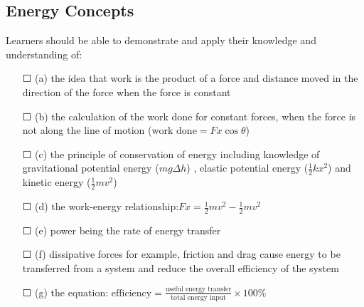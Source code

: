 \subsection{Energy Concepts}
Learners should be able to demonstrate and apply their knowledge and
understanding of:
\begin{itemize}
	\item[\Large{$\Square$}](a) the idea that work is the product of a force and distance moved in the
	direction of the force when the force is constant
	\item[\Large{$\Square$}](b) the calculation of the work done for constant forces, when the force is not along the line of motion (\(\text{work done} = Fx \cos \theta \))
	\item[\Large{$\Square$}](c) the principle of conservation of energy including knowledge of \sq gravitational potential energy (\(mg \Delta h\)) , \sq elastic potential energy (\(\frac{1}{2}kx^{2}\))  and \sq kinetic energy (\(\frac{1}{2}mv^{2}\))
	\item[\Large{$\Square$}](d) the work-energy relationship:\( Fx=\frac{1}{2}mv^{2}-\frac{1}{2}mv^{2}\)
	\item[\Large{$\Square$}](e) power being the rate of energy transfer
	\item[\Large{$\Square$}](f) dissipative forces for example, friction and drag cause energy to be
	transferred from a system and reduce the overall efficiency of the system
	\item[\Large{$\Square$}](g) the equation: $\text{efficiency} = \frac{\text{useful energy transfer}}{\text{total energy input}} \times 100\% $
	
\end{itemize}
